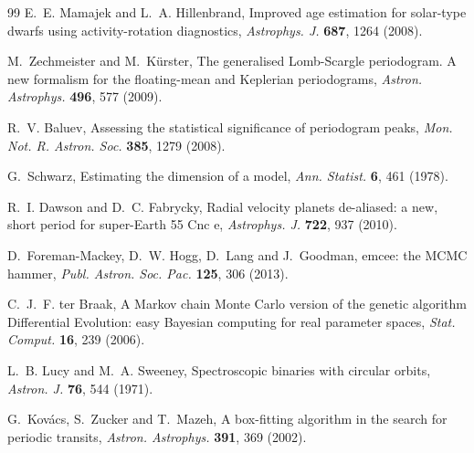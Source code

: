 \documentclass[3p,11pt]{elsarticle}
\begin{document}
\begin{thebibliography}{99}
E.~E. Mamajek and L.~A. Hillenbrand, Improved age estimation for solar-type dwarfs using
activity-rotation diagnostics, \emph{Astrophys. J.} \textbf{687}, 1264 (2008).

M.~Zechmeister and M.~K\"urster, The generalised Lomb-Scargle periodogram. A new formalism for the
floating-mean and Keplerian periodograms, \emph{Astron. Astrophys.} \textbf{496}, 577 (2009).

R.~V. Baluev, Assessing the statistical significance of periodogram peaks, \emph{Mon. Not. R. Astron.
Soc.} \textbf{385}, 1279 (2008).

G.~Schwarz, Estimating the dimension of a model, \emph{Ann. Statist.} \textbf{6}, 461 (1978).

R.~I. Dawson and D.~C. Fabrycky, Radial velocity planets de-aliased: a new, short period for super-Earth
55 Cnc e, \emph{Astrophys. J.} \textbf{722}, 937 (2010).

D.~Foreman-Mackey, D.~W. Hogg, D.~Lang and J.~Goodman, emcee: the MCMC hammer, \emph{Publ. Astron. Soc.
Pac.} \textbf{125}, 306 (2013).

C.~J.~F. ter Braak, A Markov chain Monte Carlo version of the genetic algorithm Differential Evolution:
easy Bayesian computing for real parameter spaces, \emph{Stat. Comput.} \textbf{16}, 239 (2006).

L.~B. Lucy and M.~A. Sweeney, Spectroscopic binaries with circular orbits, \emph{Astron. J.}
\textbf{76}, 544 (1971).

G.~Kov\'acs, S.~Zucker and T.~Mazeh, A box-fitting algorithm in the search for periodic transits,
\emph{Astron. Astrophys.} \textbf{391}, 369 (2002).

\end{thebibliography}
\end{document}
